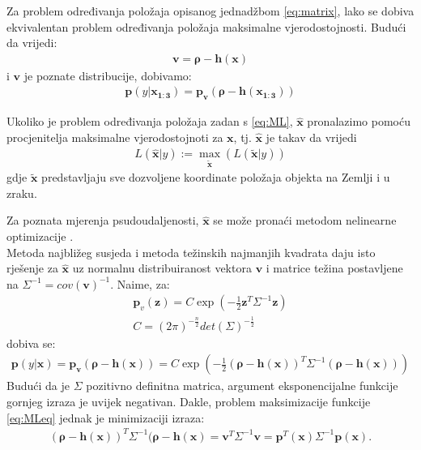 \documentclass[a4paper,twoside,12pt]{memoir} %
\begin{document}
Za problem određivanja položaja opisanog
jednadžbom \ref{eq:matrix}, lako se dobiva ekvivalentan problem određivanja položaja
 maksimalne vjerodostojnosti.
Budući da vrijedi:
\begin{align}
\mathbf{v} = \mathbf{\rho}-\mathbf{h}(\mathbf{x})
\end{align}%
i $\mathbf{v}$ je poznate distribucije, dobivamo:
\begin{align}\label{eq:ML}
\mathbf{p}( y|\mathbf{x_{1:3}} ) = \mathbf{p_v} \left(\mathbf{\rho}-\mathbf{h}(\mathbf{x_{1:3}}) \right)
\end{align}

Ukoliko je problem određivanja položaja zadan s \ref{eq:ML},
$\hat{\mathbf{x}}$ pronalazimo pomoću procjenitelja maksimalne vjerodostojnoti za $\mathbf{x}$, tj. $\hat{\mathbf{x}}$ je takav da vrijedi
\begin{align}
	L(\hat{\mathbf{x}} | y) := \max_{\tilde{\mathbf{x}}} (L(\tilde{\mathbf{x}} | y)) 
\end{align}
gdje $\tilde{\mathbf{x}}$ predstavljaju sve dozvoljene 
koordinate položaja objekta na Zemlji i u zraku.

Za poznata mjerenja psudoudaljenosti, $\hat{\mathbf{x}}$ se može pronaći metodom nelinearne optimizacije \cite{math:positioning}.\\
Metoda najbližeg susjeda i metoda težinskih najmanjih kvadrata daju isto rješenje za  $\hat{\mathbf{x}}$ uz normalnu distribuiranost vektora $\mathbf{v}$ i matrice težina postavljene na $\Sigma^{-1} = cov(\mathbf{v})^{-1}$.
Naime, za:
\begin{align*}
\mathbf{p}_v (\mathbf{z}) = C \exp \left(-\frac{1}{2} \mathbf{z}^T \Sigma^{-1} \mathbf{z}\right) \\
C = (2\pi)^{-\frac{n}{2}}det (\Sigma)^{-\frac{1}{2}}
\end{align*}
dobiva se:
\begin{align}\label{eq:MLeq}
\mathbf{p}( y|\mathbf{x} ) = \mathbf{p_v} \left(\mathbf{\rho}-\mathbf{h}(\mathbf{x}) \right)
= C \exp \left(-\frac{1}{2} (\mathbf{\rho}-\mathbf{h}(\mathbf{x}) )^T \Sigma^{-1} (\mathbf{\rho}-\mathbf{h}(\mathbf{x}) )\right)
\end{align}
Budući da je $\Sigma$ pozitivno definitna matrica, argument eksponencijalne funkcije gornjeg izraza je uvijek negativan.
Dakle, problem maksimizacije funkcije \ref{eq:MLeq} jednak je minimizaciji
izraza:
\begin{align}
(\mathbf{\rho}-\mathbf{h}(\mathbf{x}) )^T \Sigma^{-1} (\mathbf{\rho}-\mathbf{h}(\mathbf{x}) = \mathbf{v}^T \Sigma^{-1}\mathbf{v} = 
\mathbf{p}^T (\mathbf{x}) \Sigma^{-1}\mathbf{p} (\mathbf{x}).
\end{align}
\end{document}

